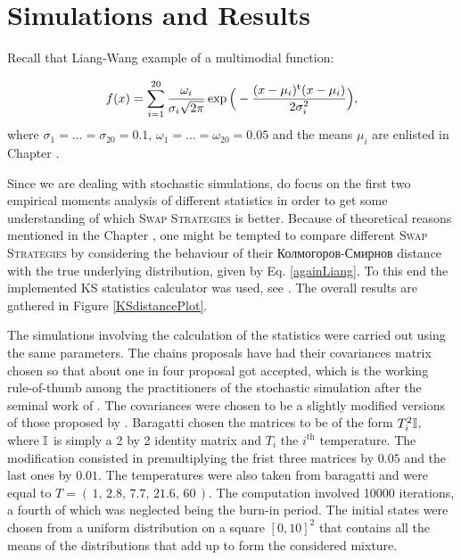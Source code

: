 \documentclass{book}
\begin{document}
\chapter{ Simulations and Results }\label{simulationsAndResults}

Recall that Liang-Wang example of a multimodial function:

\begin{equation}\label{againLiang}
f(x) = 
\sum_{i=1}^{20} \frac{\omega_i}{ \sigma_i \sqrt{2 \pi} } \exp \Big( -\frac{(x - \mu_i)^{\mathrm{t}} (x - \mu_i)}{2 \sigma_i^2} \Big),	
\end{equation}
where $\sigma_1 = \dots = \sigma_{20} = 0.1$, $\omega_1 = \dots = \omega_{20} = 0.05 $ and the means $\mu_i$ are enlisted in Chapter .

Since we are dealing with stochastic simulations, do focus on the first two empirical moments analysis of different statistics in order to get some understanding of which \textsc{Swap Strategies} is better. 
Because of theoretical reasons mentioned in the Chapter , one might be tempted to compare different \textsc{Swap Strategies} by considering the behaviour of their Колмогоров-Смирнов distance with the true underlying distribution, given by Eq. \ref{againLiang}. To this end the implemented KS statistics calculator was used, see . The overall results are gathered in Figure \ref{KSdistancePlot}. 

The simulations involving the calculation of the  statistics were carried out using the same parameters. The chains proposals have had their covariances matrix chosen so that about one in four proposal got accepted, which is the working rule-of-thumb among the practitioners of the stochastic simulation after the seminal work of \cite{ Roberts2001}. The covariances were chosen to be a slightly modified versions of those proposed by \cite{BaragattiLikelihoodFreeParallelTempering}.  Baragatti chosen the matrices to be of the form $T_i^2 \mathbb{I}$, where $\mathbb{I}$ is simply a 2 by 2 identity matrix and $T_i$ the $i^\text{th}$ temperature. The modification consisted in premultiplying the frist three matrices by $0.05$ and the last ones by $0.01$. The temperatures were also taken from baragatti and were equal to $T = (\,1,\, 2.8,\, 7.7,\, 21.6,\, 60\,)$. The computation involved 10000 iterations, a fourth of which was neglected being the burn-in period. The initial states were chosen from a uniform distribution on a square $[0,10]^2$ that contains all the means of the distributions that add up to form the considered mixture.
\end{document}
